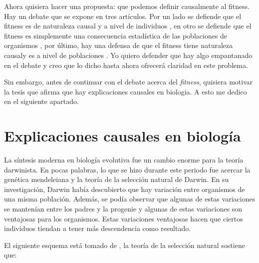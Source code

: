 Ahora quisiera hacer una propuesta: que podemos definir causalmente al fitness. Hay un debate que se expone en tres artículos. Por un lado se defiende que el fitness es de naturaleza causal y a nivel de individuos \cite{Bouchard2004}, en otro se defiende que el fitness es simplemente una consecuencia estadística de las poblaciones de organismos \cite{Walsh2002}, por último, hay una defensa de que el fitness tiene naturaleza causaly es a nivel de poblaciones \cite{Millstein2006}. Yo quiero defender que hay algo empantanado en el debate y creo que lo dicho hasta ahora ofrecerá claridad en este problema.

Sin embargo, antes de continuar con el debate acerca del \emph{fitness}, quisiera motivar la tesis que afirma que hay explicaciones causales en biologia. A esto me dedico en el siguiente apartado.


\section{Explicaciones causales en biología}

\noindent La síntesis moderna en biología evolutiva fue un cambio enorme para la teoría darwinista. En pocas palabras, lo que se hizo durante este periodo fue acercar la genética mendeleiana y la teoría de la selección natural de Darwin. En su investigación, Darwin había descubierto que hay variación entre organismos de una misma población. Además, se podía observar que algunas de estas variaciones se mantenían entre los padres y la progenie y algunas de estas variaciones son ventajosas para los organismos. Estas variaciones ventajosas hacen que ciertos individuos tiendan a tener más descendencia como resultado.

El siguiente esquema está tomado de , la teoría de la selección natural sostiene que:

